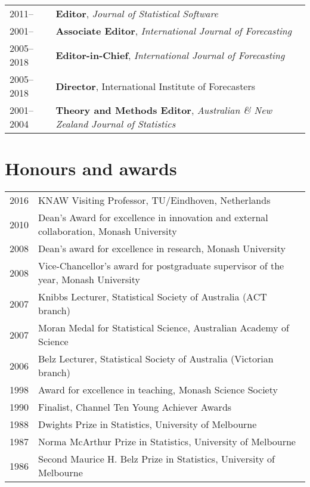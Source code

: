 \documentclass[10pt,a4paper,]{article}
\begin{document}
\begin{tabular}{ll}
  2011-- & \textbf{Editor}, \textit{Journal of Statistical Software} \\ 
  2001-- & \textbf{Associate Editor}, \textit{International Journal of Forecasting} \\ 
  2005--2018 & \textbf{Editor-in-Chief}, \textit{International Journal of Forecasting} \\ 
  2005--2018 & \textbf{Director}, International Institute of Forecasters \\ 
  2001--2004 & \textbf{Theory and Methods Editor}, \emph{Australian \& New Zealand Journal of Statistics} \\ 
  \end{tabular}

\hypertarget{honours-and-awards}{%
\section{Honours and awards}\label{honours-and-awards}}

\begin{tabular}{rl}
  2016 & KNAW Visiting Professor, TU/Eindhoven, Netherlands \\ 
  2010 & Dean's Award for excellence in innovation and external collaboration, Monash University \\ 
  2008 & Dean's award for excellence in research, Monash University \\ 
  2008 & Vice-Chancellor's award for postgraduate supervisor of the year, Monash University \\ 
  2007 & Knibbs Lecturer, Statistical Society of Australia (ACT branch) \\ 
  2007 & Moran Medal for Statistical Science, Australian Academy of Science \\ 
  2006 & Belz Lecturer, Statistical Society of Australia (Victorian branch) \\ 
  1998 & Award for excellence in teaching, Monash Science Society \\ 
  1990 & Finalist, Channel Ten Young Achiever Awards \\ 
  1988 & Dwights Prize in Statistics, University of Melbourne \\ 
  1987 & Norma McArthur Prize in Statistics, University of Melbourne \\ 
  1986 & Second Maurice H. Belz Prize in Statistics, University of Melbourne \\ 
  \end{tabular}
\end{document}
